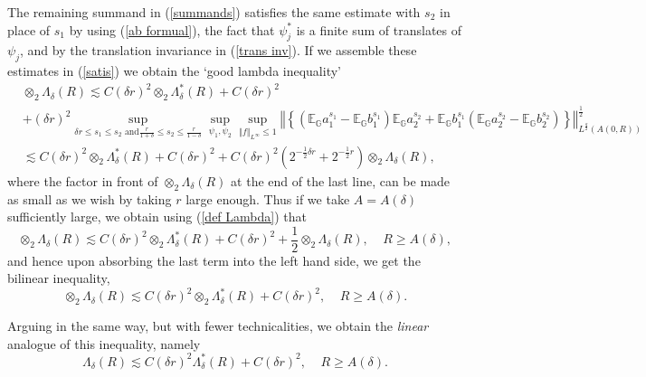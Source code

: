 \documentclass{amsart}%
\theoremstyle{plain}
\numberwithin{equation}{section}
\begin{document}
The remaining summand in (\ref{summands}) satisfies the same estimate with
$s_{2}$ in place of $s_{1}$ by using (\ref{ab formual}), the fact that
$\psi_{j}^{\ast}$ is a finite sum of translates of $\psi_{j}$, and by the
translation invariance in (\ref{trans inv}). If we assemble these estimates in
(\ref{satis}) we obtain the `good lambda inequality'%
\begin{align*}
& \otimes_{2}\Lambda_{\delta}\left(  R\right)  \lesssim C\left(  \delta
r\right)  ^{2}\otimes_{2}\Lambda_{\delta}^{\ast}\left(  R\right)  +C\left(
\delta r\right)  ^{2}\\
& +\left(  \delta r\right)  ^{2}\sup_{\delta r\leq s_{1}\leq s_{2}\text{ and
}\frac{r}{1+\delta}\leq s_{2}\leq\frac{r}{1-\delta}}\sup_{\psi_{1},\psi_{2}%
}\sup_{\left\Vert f\right\Vert _{L^{\infty}}\leq1}\left\Vert \left\{  \left(
\mathbb{E}_{\mathbb{G}}a_{1}^{s_{1}}-\mathbb{E}_{\mathbb{G}}b_{1}^{s_{1}%
}\right)  \mathbb{E}_{\mathbb{G}}a_{2}^{s_{2}}+\mathbb{E}_{\mathbb{G}}%
b_{1}^{s_{1}}\left(  \mathbb{E}_{\mathbb{G}}a_{2}^{s_{2}}-\mathbb{E}%
_{\mathbb{G}}b_{2}^{s_{2}}\right)  \right\}  \right\Vert _{L^{\frac{q}{2}%
}\left(  A\left(  0,R\right)  \right)  }^{\frac{1}{2}}\\
& \lesssim C\left(  \delta r\right)  ^{2}\otimes_{2}\Lambda_{\delta}^{\ast
}\left(  R\right)  +C\left(  \delta r\right)  ^{2}+C\left(  \delta r\right)
^{2}\left(  2^{-\frac{1}{2}\delta r}+2^{-\frac{1}{2}r}\right)  \otimes
_{2}\Lambda_{\delta}\left(  R\right)  ,
\end{align*}
where the factor in front of $\otimes_{2}\Lambda_{\delta}\left(  R\right)  $
at the end of the last line, can be made as small as we wish by taking $r$
large enough. Thus if we take $A=A\left(  \delta\right)  $ sufficiently large,
we obtain using (\ref{def Lambda}) that%
\[
\otimes_{2}\Lambda_{\delta}\left(  R\right)  \lesssim C\left(  \delta
r\right)  ^{2}\otimes_{2}\Lambda_{\delta}^{\ast}\left(  R\right)  +C\left(
\delta r\right)  ^{2}+\frac{1}{2}\otimes_{2}\Lambda_{\delta}\left(  R\right)
,\ \ \ \ \ R\geq A\left(  \delta\right)  ,
\]
and hence upon absorbing the last term into the left hand side, we get the
bilinear inequality,%
\[
\otimes_{2}\Lambda_{\delta}\left(  R\right)  \lesssim C\left(  \delta
r\right)  ^{2}\otimes_{2}\Lambda_{\delta}^{\ast}\left(  R\right)  +C\left(
\delta r\right)  ^{2},\ \ \ \ \ R\geq A\left(  \delta\right)  .
\]


Arguing in the same way, but with fewer technicalities, we obtain the
\emph{linear} analogue of this inequality, namely%
\[
\Lambda_{\delta}\left(  R\right)  \lesssim C\left(  \delta r\right)
^{2}\Lambda_{\delta}^{\ast}\left(  R\right)  +C\left(  \delta r\right)
^{2},\ \ \ \ \ R\geq A\left(  \delta\right)  .
\]
\end{document}
